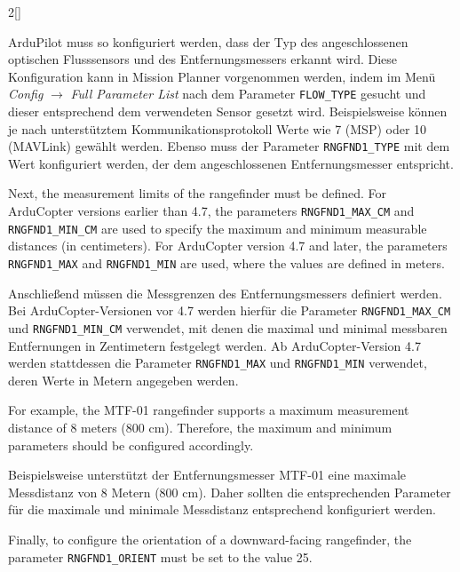 \begin{paracol}{2}[]
\colger

ArduPilot muss so konfiguriert werden, dass der Typ des angeschlossenen optischen Flusssensors und des Entfernungsmessers erkannt wird. Diese Konfiguration kann in Mission Planner vorgenommen werden, indem im Menü \textit{Config} \(\longrightarrow\) \textit{Full Parameter List} nach dem Parameter \texttt{FLOW\_TYPE} gesucht und dieser entsprechend dem verwendeten Sensor gesetzt wird. Beispielsweise können je nach unterstütztem Kommunikationsprotokoll Werte wie 7 (MSP) oder 10 (MAVLink) gewählt werden. Ebenso muss der Parameter \texttt{RNGFND1\_TYPE} mit dem Wert konfiguriert werden, der dem angeschlossenen Entfernungsmesser entspricht.

\coleng

Next, the measurement limits of the rangefinder must be defined. For ArduCopter versions earlier than 4.7, the parameters \texttt{RNGFND1\_MAX\_CM} and \texttt{RNGFND1\_MIN\_CM} are used to specify the maximum and minimum measurable distances (in centimeters). For ArduCopter version 4.7 and later, the parameters \texttt{RNGFND1\_MAX} and \texttt{RNGFND1\_MIN} are used, where the values are defined in meters.

\colger

Anschließend müssen die Messgrenzen des Entfernungsmessers definiert werden. Bei ArduCopter-Versionen vor 4.7 werden hierfür die Parameter \texttt{RNGFND1\_MAX\_CM} und \texttt{RNGFND1\_MIN\_CM} verwendet, mit denen die maximal und minimal messbaren Entfernungen in Zentimetern festgelegt werden. Ab ArduCopter-Version 4.7 werden stattdessen die Parameter \texttt{RNGFND1\_MAX} und \texttt{RNGFND1\_MIN} verwendet, deren Werte in Metern angegeben werden.

\coleng

For example, the MTF-01 rangefinder supports a maximum measurement distance of 8 meters (800 cm). Therefore, the maximum and minimum parameters should be configured accordingly.

\colger

Beispielsweise unterstützt der Entfernungsmesser MTF-01 eine maximale Messdistanz von 8 Metern (800 cm). Daher sollten die entsprechenden Parameter für die maximale und minimale Messdistanz entsprechend konfiguriert werden.

\coleng

Finally, to configure the orientation of a downward-facing rangefinder, the parameter \texttt{RNGFND1\_ORIENT} must be set to the value 25.

\colger


\end{paracol}
